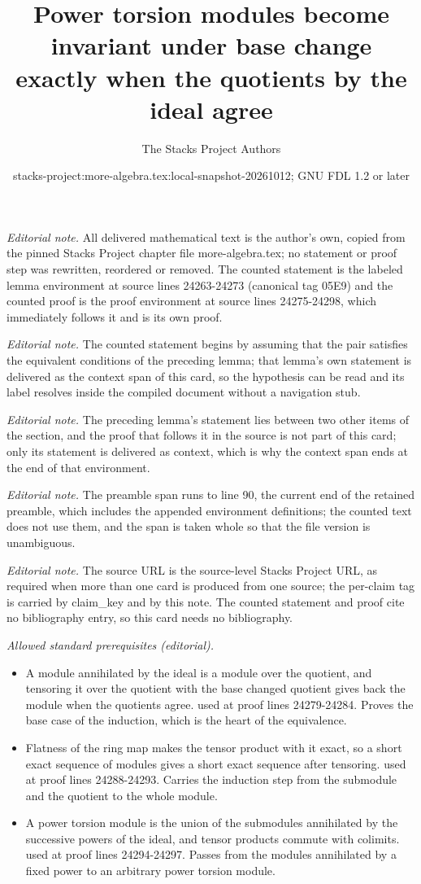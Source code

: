 \documentclass[10pt,a4paper]{amsart}
\title{Power torsion modules become invariant under base change exactly when the quotients by the ideal agree}
\author{The Stacks Project Authors}
\date{stacks-project:more-algebra.tex:local-snapshot-20261012; GNU FDL 1.2 or later}
\theoremstyle{plain}
\theoremstyle{definition}
\theoremstyle{remark}
\numberwithin{equation}{subsection}
\begin{document}
\maketitle
\setcounter{subsection}{1}
\noindent\textit{Editorial note.} All delivered mathematical text is the author's own, copied from the pinned Stacks Project chapter file more-algebra.tex; no statement or proof step was rewritten, reordered or removed. The counted statement is the labeled lemma environment at source lines 24263-24273 (canonical tag 05E9) and the counted proof is the proof environment at source lines 24275-24298, which immediately follows it and is its own proof.\par\medskip
\noindent\textit{Editorial note.} The counted statement begins by assuming that the pair satisfies the equivalent conditions of the preceding lemma; that lemma's own statement is delivered as the context span of this card, so the hypothesis can be read and its label resolves inside the compiled document without a navigation stub.\par\medskip
\noindent\textit{Editorial note.} The preceding lemma's statement lies between two other items of the section, and the proof that follows it in the source is not part of this card; only its statement is delivered as context, which is why the context span ends at the end of that environment.\par\medskip
\noindent\textit{Editorial note.} The preamble span runs to line 90, the current end of the retained preamble, which includes the appended environment definitions; the counted text does not use them, and the span is taken whole so that the file version is unambiguous.\par\medskip
\noindent\textit{Editorial note.} The source URL is the source-level Stacks Project URL, as required when more than one card is produced from one source; the per-claim tag is carried by claim\_key and by this note. The counted statement and proof cite no bibliography entry, so this card needs no bibliography.\par\medskip
\noindent\textit{Allowed standard prerequisites (editorial).}\begin{itemize}
\item A module annihilated by the ideal is a module over the quotient, and tensoring it over the quotient with the base changed quotient gives back the module when the quotients agree. used at proof lines 24279-24284. Proves the base case of the induction, which is the heart of the equivalence.
\item Flatness of the ring map makes the tensor product with it exact, so a short exact sequence of modules gives a short exact sequence after tensoring. used at proof lines 24288-24293. Carries the induction step from the submodule and the quotient to the whole module.
\item A power torsion module is the union of the submodules annihilated by the successive powers of the ideal, and tensor products commute with colimits. used at proof lines 24294-24297. Passes from the modules annihilated by a fixed power to an arbitrary power torsion module.
\end{itemize}\medskip
\end{document}
